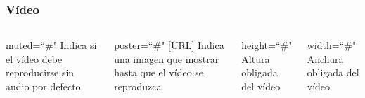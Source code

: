 \documentclass{beamer}
\begin{document}
\begin{frame}[fragile]
\frametitle{Vídeo}
	\begin{columns}[c]
	\begin{block}{muted=``\#"}
	Indica si el vídeo debe reproducirse sin audio por defecto
	\end{block}
	\begin{block}{poster=``\#" [URL]}
	Indica una imagen que mostrar hasta que el vídeo se reproduzca
	\end{block}
	\begin{block}{height=``\#"}
	Altura obligada del vídeo
	\end{block}
	\begin{block}{width=``\#"}
	Anchura obligada del vídeo
	\end{block}
	\end{columns}
\end{frame}	
\end{document}
